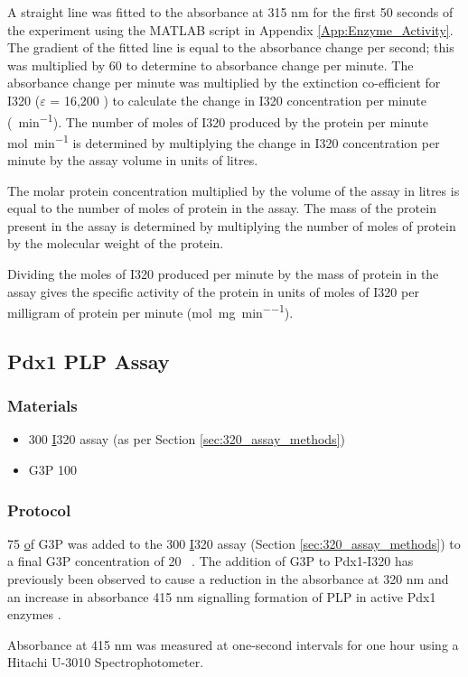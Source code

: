 A straight line was fitted to the absorbance at 315 nm for the first 50 seconds of the experiment using the MATLAB script in Appendix \ref{App:Enzyme_Activity}. The gradient of the fitted line is equal to the absorbance change per second; this was multiplied by 60 to determine to absorbance change per minute. The absorbance change per minute was multiplied by the extinction co-efficient for I320 ($\varepsilon$ = 16,200 \cite{Raschle2007}) to calculate the change in I320 concentration per minute (\si{\molar\per\minute}). The number of moles of I320 produced by the protein per minute \si{\mole\per\minute} is determined by multiplying the change in I320 concentration per minute by the assay volume in units of litres.  

The molar protein concentration multiplied by the volume of the assay in litres is equal to the number of moles of protein in the assay. The mass of the protein present in the assay is determined by multiplying the number of moles of protein by the molecular weight of the protein.

Dividing the moles of I320 produced per minute by the mass of protein in the assay gives the specific activity of the protein in units of moles of I320 per milligram of protein per minute (\si{\mol\per\milli\gram\per\minute}).      
	
\newpage		
		\subsection*{Pdx1 PLP Assay}
		\subsubsection{Materials}
				\begin{itemize}
				\item 300 \ul I320 assay (as per Section \ref{sec:320_assay_methods})
				\item G3P 100 \si{\milli\molar}
				\end{itemize}
		\subsubsection{Protocol} 
75 \ul of G3P was added to the 300 \ul I320 assay (Section \ref{sec:320_assay_methods}) to a final G3P concentration of 20 \si{\milli\molar}. The addition of G3P to Pdx1-I320 has previously been observed to cause a reduction in the absorbance at 320 nm and an increase in absorbance 415 nm signalling formation of PLP in active Pdx1 enzymes \cite{Raschle2007}. \par
		Absorbance at 415 \si{\nano\metre} was measured at one-second intervals for one hour using a Hitachi U-3010 Spectrophotometer.
		

